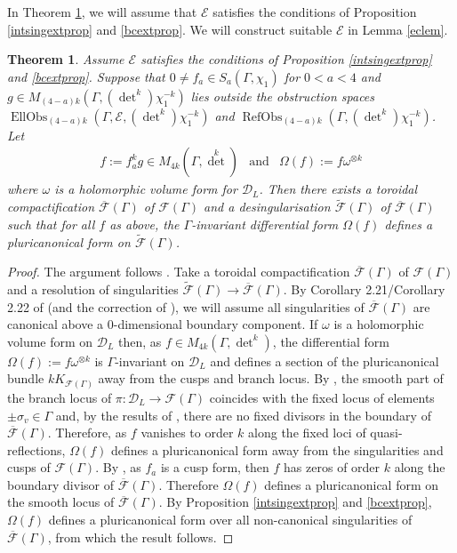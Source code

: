 \documentclass[12pt, a4paper]{article}
\newtheorem{thm}{Theorem}[section]
\newcommand{\dc}{\mathcal{D}}
\newcommand{\ec}{\mathcal{E}}
\newcommand{\fc}{\mathcal{F}}
\newcommand{\opn}{\operatorname}
\begin{document}
\sloppy
In Theorem \ref{lwcft}, we will assume that $\ec$ satisfies the conditions of Proposition \ref{intsingextprop} and \ref{bcextprop}.
We will construct suitable $\ec$ in Lemma \ref{eclem}.
\begin{thm}\label{lwcft}
  Assume $\ec$ satisfies the conditions of Proposition \ref{intsingextprop} and \ref{bcextprop}. 
  Suppose that $0 \neq f_a \in S_a(\Gamma, \chi_1)$ for $0<a<4$ and $g \in M_{(4-a)k}(\Gamma, (\opn{det}^k)\chi_1^{-k} )$
  lies outside the obstruction spaces
  $\opn{EllObs}_{(4-a)k}(\Gamma, \ec, (\opn{det}^k)\chi_1^{-k} )$
  and
  $\opn{RefObs}_{(4-a)k}(\Gamma, (\opn{det}^k)\chi_1^{-k})$.
  Let 
  \[
    \begin{array}{ccc}
      f:=f_a^k g \in M_{4k}(\Gamma, \opn{det}^k) 
      & \text{and} &
      \Omega(f):=f \omega^{\otimes k}
    \end{array}
  \] 
  where $\omega$ is a holomorphic volume form for $\dc_L$.
  Then there exists a toroidal compactification $\overline{\fc}(\Gamma)$ of $\fc(\Gamma)$ and a desingularisation $\widetilde{\fc}(\Gamma)$ of $\overline{\fc}(\Gamma)$ such that for all $f$ as above, the $\Gamma$-invariant differential form $\Omega(f)$ defines a pluricanonical form on $\widetilde{\fc}(\Gamma)$.
\end{thm}
\begin{proof}
  The argument follows \cite[Theorem 1.1]{GHSK3}. 
Take a toroidal compactification $\overline{\fc}(\Gamma)$ of $\fc(\Gamma)$ and a resolution of singularities $\widetilde{\fc}(\Gamma) \rightarrow \overline{\fc}(\Gamma)$.
  By Corollary 2.21/Corollary 2.22 of \cite{GHSK3} (and the correction of \cite{Ma}), we will assume all singularities of $\overline{\fc}(\Gamma)$ are canonical above a 0-dimensional boundary component.
  If $\omega$ is a holomorphic volume form on $\dc_L$ then, as $f \in M_{4k}(\Gamma, \opn{det}^k)$, the differential form $\Omega(f):=f \omega^{\otimes k}$ is $\Gamma$-invariant on $\dc_L$ and defines a section of the pluricanonical bundle $kK_{\fc(\Gamma)}$ away from the cusps and branch locus. 
  By \cite[Corollary 2.13]{GHSK3}, the smooth part of the branch locus of $\pi: \dc_L \rightarrow \fc(\Gamma)$ coincides with the fixed locus of elements $\pm \sigma_v \in \Gamma$ and, by the results of \cite{MaIrregularCusps}, there are no fixed divisors in the boundary of $\overline{\fc}(\Gamma)$.
  Therefore, as $f$ vanishes to order $k$ along the fixed loci of quasi-reflections, $\Omega(f)$ defines a pluricanonical form away from the singularities and cusps of $\fc(\Gamma)$.
  By \cite[Theorem 1.1 p.192]{AMRT}, as $f_a$ is a cusp form, then $f$ has zeros of order $k$ along the boundary divisor of $\overline{\fc}(\Gamma)$.
Therefore  $\Omega(f)$ defines a pluricanonical form on the smooth locus of $\overline{\fc}(\Gamma)$.
  By Proposition \ref{intsingextprop} and \ref{bcextprop}, $\Omega(f)$ defines a pluricanonical form over all non-canonical singularities of $\overline{\fc}(\Gamma)$, from which the result follows.
\end{proof}
\end{document}

